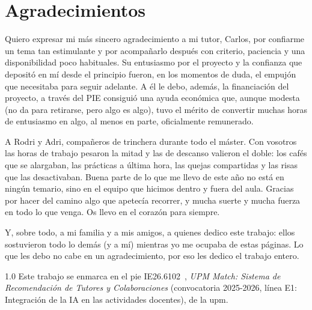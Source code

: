 \section*{Agradecimientos}
\label{sec:acknowledgement}

Quiero expresar mi más sincero agradecimiento a mi tutor, Carlos, por confiarme un tema tan estimulante y por acompañarlo después con criterio, paciencia y una disponibilidad poco habituales.
Su entusiasmo por el proyecto y la confianza que depositó en mí desde el principio fueron, en los momentos de duda, el empujón que necesitaba para seguir adelante.
A él le debo, además, la financiación del proyecto, a través del PIE consiguió una ayuda económica que, aunque modesta (no da para retirarse, pero algo es algo), tuvo el mérito de convertir muchas horas de entusiasmo en algo, al menos en parte, oficialmente remunerado.

A Rodri y Adri, compañeros de trinchera durante todo el máster.
Con vosotros las horas de trabajo pesaron la mitad y las de descanso valieron el doble: los cafés que se alargaban, las prácticas a última hora, las quejas compartidas y las risas que las desactivaban.
Buena parte de lo que me llevo de este año no está en ningún temario, sino en el equipo que hicimos dentro y fuera del aula.
Gracias por hacer del camino algo que apetecía recorrer, y mucha suerte y mucha fuerza en todo lo que venga.
Os llevo en el corazón para siempre.

Y, sobre todo, a mi familia y a mis amigos, a quienes dedico este trabajo: ellos sostuvieron todo lo demás (y a mí) mientras yo me ocupaba de estas páginas.
Lo que les debo no cabe en un agradecimiento, por eso les dedico el trabajo entero.

\vspace{\fill}
\begin{spacing}{1.0}
    Este trabajo se enmarca en el \gls{pie} IE26.6102~\cite{pie_upmmatch_2026}, \emph{UPM Match: Sistema de Recomendación de Tutores y Colaboraciones} (convocatoria 2025-2026, línea E1: Integración de la IA en las actividades docentes), de la \gls{upm}.
\end{spacing}
